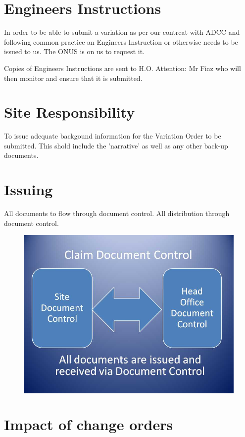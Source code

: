 \section*{Engineers Instructions}

In order to be able to submit a variation as per our contrcat with ADCC and following common practice an Engineers Instruction or otherwise needs to be issued to us. The ONUS is on us to request it.

Copies of Engineers Instructions are sent to H.O. Attention: Mr Fiaz who will then monitor and ensure that it is submitted.

\section*{Site Responsibility}

To issue adequate backgound information for the Variation Order to be submitted. This shold include the 'narrative' as well as any other back-up documents.


\section*{Issuing}

All documents to flow through document control. All distribution through document control.

\begin{figure}
\includegraphics[width=1.3\textwidth]{./graphics/document-control-01}
\end{figure}


\section*{Impact of change orders}

